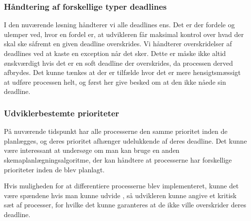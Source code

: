 \subsubsection{Håndtering af forskellige typer deadlines}
I den nuværende løsning håndterer vi alle deadlines ens. Det er der fordele og ulemper ved, hvor en fordel er, at udvikleren får maksimal kontrol over hvad der skal ske såfremt en given deadline overskrides. Vi håndterer overskridelser af deadlines ved at kaste en exception når det sker. Dette er måske ikke altid ønskværdigt hvis det er en soft deadline der overskrides, da processen derved afbrydes. Det kunne tænkes at der er tilfælde hvor det er mere hensigtsmæssigt at udføre processen helt, og først her give besked om at den ikke nåede sin deadline.



\subsubsection{Udviklerbestemte prioriteter}
På nuværende tidspunkt har alle processerne den samme prioritet inden de planlægges, og deres prioritet afhænger udelukkende af deres deadline. Det kunne være interessant at undersøge om man kan bruge en anden skemaplanlægningsalgoritme, der kan håndtere at processerne har forskellige prioriteter inden de blev planlagt.

Hvis muligheden  for at differentiere processerne blev implementeret, kunne det være spændene hvis man kunne udvide \sched, så udvikleren kunne angive et kritisk sæt af processer, for hvilke det kunne garanteres at de ikke ville overskrider deres deadline. 






